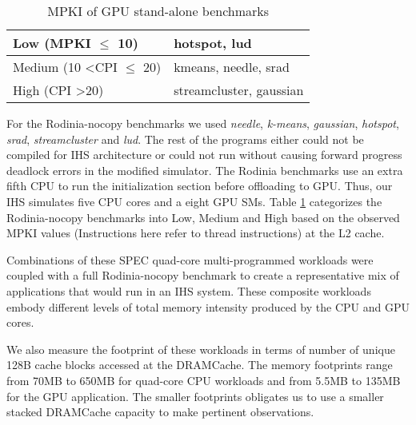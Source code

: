 \begin{table}[htb]
	\centering
	\begin{tabular}{|l|l|}
		\hline
		Low (MPKI $\leq$ 10)                & hotspot, lud           \\ \hline
		Medium (10 \textless CPI $\leq$ 20) &  kmeans, needle, srad   \\ \hline
		High (CPI \textgreater 20)            & streamcluster, gaussian       \\ \hline
	\end{tabular}
	\caption{MPKI of GPU stand-alone benchmarks}
	\label{single-gpu-mpki}
\end{table}

For the Rodinia-nocopy benchmarks we used \textit{needle}, \textit{k-means}, \textit{gaussian}, \textit{hotspot}, \textit{srad}, \textit{streamcluster} and \textit{lud}. The rest of the programs either could not be compiled for IHS architecture or could not run without causing forward progress deadlock errors in the modified simulator. The Rodinia benchmarks use an extra fifth CPU to run the initialization section before offloading to GPU. Thus, our IHS simulates five CPU cores and a eight GPU SMs. Table \ref{single-gpu-mpki} categorizes the Rodinia-nocopy benchmarks into Low, Medium and High based on the observed MPKI values (Instructions here refer to thread instructions) at the L2 cache.


\par Combinations of these SPEC quad-core multi-programmed workloads were coupled with a full Rodinia-nocopy benchmark to create a representative mix of applications that would run in an IHS system. These composite workloads embody different levels of total memory intensity produced by the CPU and GPU cores.
\par We also measure the footprint of these workloads in terms of number of unique 128B cache blocks accessed at the DRAMCache. The memory footprints range from 70MB to 650MB for quad-core CPU workloads and from 5.5MB to 135MB for the GPU application. The smaller footprints obligates us to use a smaller stacked DRAMCache capacity to make pertinent observations.

